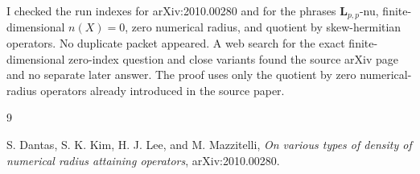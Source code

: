 \documentclass[11pt]{amsart}
\theoremstyle{definition}
\theoremstyle{remark}
\begin{document}
I checked the run indexes for arXiv:2010.00280 and for the phrases
\(\mathbf L_{p,p}\)-nu, finite-dimensional \(n(X)=0\), zero numerical radius,
and quotient by skew-hermitian operators. No duplicate packet appeared. A web
search for the exact finite-dimensional zero-index question and close variants
found the source arXiv page and no separate later answer. The proof uses only
the quotient by zero numerical-radius operators already introduced in the
source paper.

\begin{thebibliography}{9}

S. Dantas, S. K. Kim, H. J. Lee, and M. Mazzitelli,
\emph{On various types of density of numerical radius attaining operators},
arXiv:2010.00280.

\end{thebibliography}
\end{document}
